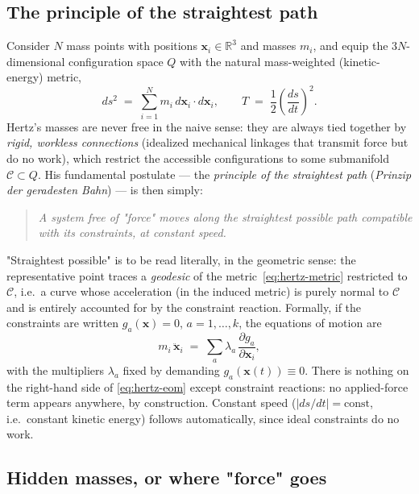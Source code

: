 \subsection{The principle of the straightest path}

Consider $N$ mass points with positions $\mathbf x_i\in\mathbb R^3$
and masses $m_i$, and equip the $3N$-dimensional configuration space
$Q$ with the natural mass-weighted (kinetic-energy) metric,
\begin{equation}
  ds^2 \;=\; \sum_{i=1}^N m_i\, d\mathbf x_i\cdot d\mathbf x_i,
  \qquad
  T \;=\; \frac12\left(\frac{ds}{dt}\right)^{\!2}.
  \label{eq:hertz-metric}
\end{equation}
Hertz's masses are never free in the naive sense: they are always
tied together by \emph{rigid, workless connections} (idealized
mechanical linkages that transmit force but do no work), which
restrict the accessible configurations to some submanifold
$\mathcal C\subset Q$. His fundamental postulate --- the
\emph{principle of the straightest path}
(\textit{Prinzip der geradesten Bahn}) --- is then simply:

\begin{quote}
\emph{A system free of "force" moves along the straightest possible
path compatible with its constraints, at constant speed.}
\end{quote}

"Straightest possible" is to be read literally, in the geometric
sense: the representative point traces a \emph{geodesic} of the
metric~\eqref{eq:hertz-metric} restricted to $\mathcal C$, i.e.\ a
curve whose acceleration (in the induced metric) is purely normal to
$\mathcal C$ and is entirely accounted for by the constraint
reaction. Formally, if the constraints are written $g_a(\mathbf
x)=0$, $a=1,\dots,k$, the equations of motion are
\begin{equation}
  m_i\,\ddot{\mathbf x}_i \;=\; \sum_a \lambda_a\,
  \frac{\partial g_a}{\partial \mathbf x_i},
  \label{eq:hertz-eom}
\end{equation}
with the multipliers $\lambda_a$ fixed by demanding $g_a(\mathbf
x(t))\equiv 0$. There is nothing on the right-hand side of
\eqref{eq:hertz-eom} except constraint reactions: no applied-force
term appears anywhere, by construction. Constant speed
($|ds/dt|=\mathrm{const}$, i.e.\ constant kinetic energy) follows
automatically, since ideal constraints do no work.

\subsection{Hidden masses, or where "force" goes}

